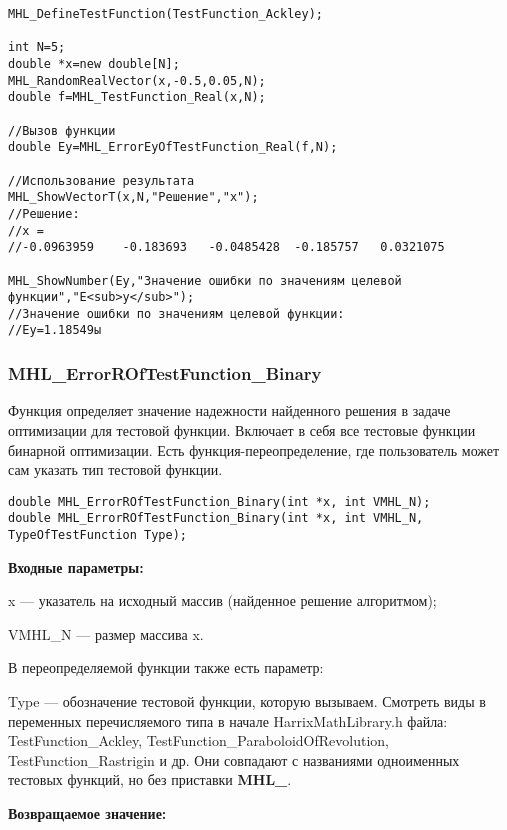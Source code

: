 \documentclass[a4paper,12pt]{article}
\begin{document}
\begin{lstlisting}[label=code_use_MHL_ErrorEyOfTestFunction_Real,caption=Пример использования]
MHL_DefineTestFunction(TestFunction_Ackley);

int N=5;
double *x=new double[N];
MHL_RandomRealVector(x,-0.5,0.05,N);
double f=MHL_TestFunction_Real(x,N);

//Вызов функции
double Ey=MHL_ErrorEyOfTestFunction_Real(f,N);

//Использование результата
MHL_ShowVectorT(x,N,"Решение","x");
//Решение:
//x =
//-0.0963959	-0.183693	-0.0485428	-0.185757	0.0321075

MHL_ShowNumber(Ey,"Значение ошибки по значениям целевой функции","E<sub>y</sub>");
//Значение ошибки по значениям целевой функции:
//Ey=1.18549ы
\end{lstlisting}

\subsubsection{MHL\_ErrorROfTestFunction\_Binary}\label{MHL_ErrorROfTestFunction_Binary}

Функция определяет значение надежности найденного решения в задаче оптимизации для тестовой функции. Включает в себя все тестовые функции бинарной оптимизации. Есть функция-переопределение, где пользователь может сам указать тип тестовой функции.


\begin{lstlisting}[label=code_syntax_MHL_ErrorROfTestFunction_Binary,caption=Синтаксис]
double MHL_ErrorROfTestFunction_Binary(int *x, int VMHL_N);
double MHL_ErrorROfTestFunction_Binary(int *x, int VMHL_N, TypeOfTestFunction Type);
\end{lstlisting}

\textbf{Входные параметры:}

x --- указатель на исходный массив (найденное решение алгоритмом);

VMHL\_N --- размер массива x.

В переопределяемой функции также есть параметр:
  
Type --- обозначение тестовой функции, которую вызываем.
Смотреть виды в переменных перечисляемого типа в начале HarrixMathLibrary.h файла: TestFunction\_Ackley, TestFunction\_ParaboloidOfRevolution, TestFunction\_Rastrigin и др. Они совпадают с названиями одноименных тестовых функций, но без приставки \textbf{MHL\_}.

\textbf{Возвращаемое значение:}
 
\end{document}
